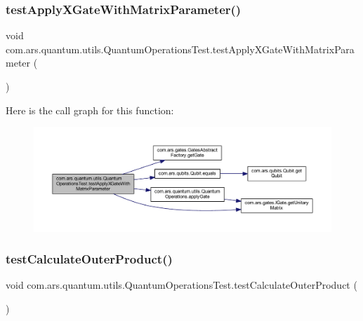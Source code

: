 \subsubsection{\texorpdfstring{test\+Apply\+X\+Gate\+With\+Matrix\+Parameter()}{testApplyXGateWithMatrixParameter()}}
{\footnotesize\ttfamily void com.\+ars.\+quantum.\+utils.\+Quantum\+Operations\+Test.\+test\+Apply\+X\+Gate\+With\+Matrix\+Parameter (\begin{DoxyParamCaption}{ }\end{DoxyParamCaption})}

Here is the call graph for this function\+:\nopagebreak
\begin{figure}[H]
\begin{center}
\leavevmode
\includegraphics[width=350pt]{classcom_1_1ars_1_1quantum_1_1utils_1_1_quantum_operations_test_ae1c0eac5931019d8d1cbd48abc8adade_cgraph}
\end{center}
\end{figure}
\hypertarget{classcom_1_1ars_1_1quantum_1_1utils_1_1_quantum_operations_test_a7a1cf1c6b0b84064cea27c39c870e470}{}\label{classcom_1_1ars_1_1quantum_1_1utils_1_1_quantum_operations_test_a7a1cf1c6b0b84064cea27c39c870e470} 
\subsubsection{\texorpdfstring{test\+Calculate\+Outer\+Product()}{testCalculateOuterProduct()}}
{\footnotesize\ttfamily void com.\+ars.\+quantum.\+utils.\+Quantum\+Operations\+Test.\+test\+Calculate\+Outer\+Product (\begin{DoxyParamCaption}{ }\end{DoxyParamCaption})}

